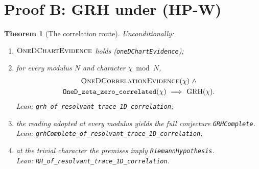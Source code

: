 \documentclass[11pt]{article}
\newtheorem{theorem}{Theorem}
\theoremstyle{definition}
\begin{document}
\section{Proof B: GRH under (HP-W)}\label{sec:grh-proofB}

\begin{theorem}[The correlation route]\label{thm:grh-routeB}
Unconditionally:
\begin{enumerate}[label=\textup{(\roman*)},leftmargin=*,nosep]
\item \(\textsc{OneDChartEvidence}\) holds
(\texttt{oneDChartEvidence});
\item for every modulus \(N\) and character \(\chi\bmod N\),
\[
\begin{gathered}
\textsc{OneDCorrelationEvidence}(\chi)\ \wedge\\
\texttt{OneD\_zeta\_zero\_correlated}(\chi)
\ \Longrightarrow\ \mathrm{GRH}(\chi).
\end{gathered}
\]
Lean: \texttt{grh\_of\_resolvant\_trace\_1D\_correlation};
\item the reading adopted at every modulus yields the full conjecture
\texttt{GRHComplete}.\\
Lean: \texttt{grhComplete\_of\_resolvant\_trace\_1D\_correlation};
\item at the trivial character the premises imply
\texttt{RiemannHypothesis}.\\
Lean: \texttt{RH\_of\_resolvant\_trace\_1D\_correlation}.
\end{enumerate}
\end{theorem}
\end{document}
